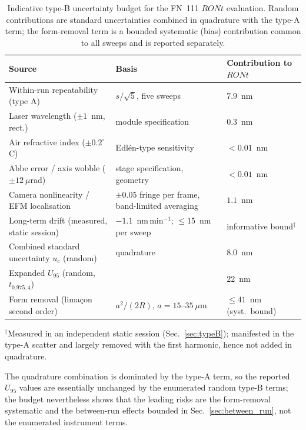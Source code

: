 \documentclass[review]{elsarticle}
\begin{document}
\begin{table}[htbp]
\centering
\footnotesize
\caption{Indicative type-B uncertainty budget for the FN~111 $RONt$ evaluation. Random contributions are standard uncertainties combined in quadrature with the type-A term; the form-removal term is a bounded systematic (bias) contribution common to all sweeps and is reported separately.}
\label{tab:typeB}
\begin{tabular}{p{}p{}p{}}
\toprule
Source & Basis & Contribution to $RONt$ \\
\midrule
Within-run repeatability (type A) & $s/\sqrt{5}$, five sweeps & $7.9$~nm \\
Laser wavelength ($\pm1$~nm, rect.) & module specification & $0.3$~nm \\
Air refractive index ($\pm0.2^\circ$C) & Edl\'{e}n-type sensitivity & $<0.01$~nm \\
Abbe error / axis wobble ($\pm12~\mu$rad) & stage specification, geometry & $<0.01$~nm \\
Camera nonlinearity / EFM localisation & $\pm0.05$ fringe per frame, band-limited averaging & $1.1$~nm \\
Long-term drift (measured, static session) & $-1.1$~nm\,min$^{-1}$; $\leq15$~nm per sweep & informative bound$^{\dagger}$ \\
\midrule
Combined standard uncertainty $u_c$ (random) & quadrature & $8.0$~nm \\
Expanded $U_{95}$ (random, $t_{0.975,4}$) & & $22$~nm \\
\midrule
Form removal (lima\c{c}on second order) & $a^2/(2R)$, $a=15$--$35~\mu$m & $\leq41$~nm (syst.\ bound) \\
\bottomrule
\end{tabular}

\smallskip
{\footnotesize $^{\dagger}$Measured in an independent static session (Sec.~\ref{sec:typeB}); manifested in the type-A scatter and largely removed with the first harmonic, hence not added in quadrature.}
\end{table}

The quadrature combination is dominated by the type-A term, so the reported $U_{95}$ values are essentially unchanged by the enumerated random type-B terms; the budget nevertheless shows that the leading risks are the form-removal systematic and the between-run effects bounded in Sec.~\ref{sec:between_run}, not the enumerated instrument terms.
\end{document}
